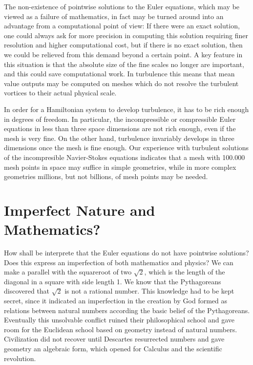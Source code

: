 The non-existence of pointwise solutions to the Euler equations, 
which may be viewed as a failure of mathematics, in fact may be turned around
into an advantage from a computational point of view: If there were an exact
solution, one could always ask for more precision 
in computing this solution requiring finer resolution and higher 
computational cost, but if there is no exact solution, 
then we could be relieved from this demand beyond a certain point. 
A key feature in this situation is that the absolute size of the 
fine scales no longer are important, and this could save computational work.
In turbulence this means that mean value outputs may be computed 
on meshes which do not resolve the turbulent vortices to their actual
physical scale.

In order for a Hamiltonian system to develop turbulence, it has
to be rich enough in degrees of freedom. In particular, the incompressible
or compressible Euler equations in less than three 
space dimensions are not rich 
enough, even if the mesh is very fine. On the other hand,
turbulence invariably develops in three dimensions once the mesh is
fine enough. 
Our experience with turbulent solutions of the incompresible
Navier-Stokes equations indicates that a mesh with 100.000 mesh points
in space may suffice in simple geometries, while in more complex geometries 
millions, but not billions, of mesh points may be needed.







 
\section{Imperfect Nature and Mathematics?}

How shall be interprete that the Euler equations do not have 
pointwise solutions? Does this express an imperfection of 
both mathematics and physics? 
We can make a parallel with the squareroot of two $\sqrt{2}$, which is
the length of the diagonal in a square with side length 1.
We know that the Pythagoreans discovered that $\sqrt{2}$ is not a rational
number. This knowledge had to be kept secret, since it indicated
an imperfection in the creation by God formed as relations
between natural numbers according the basic belief of the Pythagoreans. 
Eventually this unsolvable conflict ruined their philosophical school
and gave room for the Euclidean school based on geometry instead of
natural numbers. Civilization did not recover until Descartes
resurrected numbers and gave geometry an algebraic form, which 
opened for Calculus and the scientific revolution.

